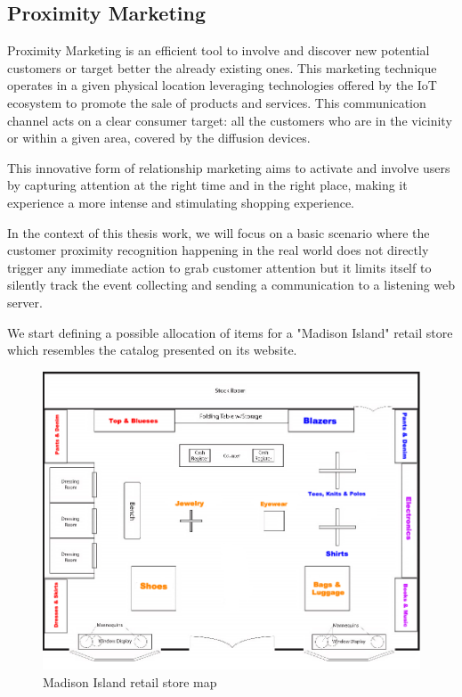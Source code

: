 \subsection{Proximity Marketing}
\label{ssection:proximity-marketing}

Proximity Marketing is an efficient tool to involve and discover new potential customers or target better the already existing ones. This marketing technique operates in a given physical location leveraging technologies offered by the IoT ecosystem to promote the sale of products and services.  This communication channel acts on a clear consumer target: all the customers who are in the vicinity or within a given area, covered by the diffusion devices.

This innovative form of relationship marketing aims to activate and involve users by capturing attention at the right time and in the right place, making it experience a more intense and stimulating shopping experience.

In the context of this thesis work, we will focus on a basic scenario where the customer proximity recognition happening in the real world does not directly trigger any immediate action to grab customer attention but it limits itself to silently track the event collecting and sending a communication to a listening web server.

We start defining a possible allocation of items for a "Madison Island" retail store which resembles the catalog presented on its website.

\vspace{0.5cm}
\begin{figure}[H]
  \centering
    \includegraphics[width=16cm]{images/madison/retail-map.jpg}
  \caption{Madison Island retail store map}
  \label{fig:retail-map}
\end{figure}
\vspace{0.5cm}

